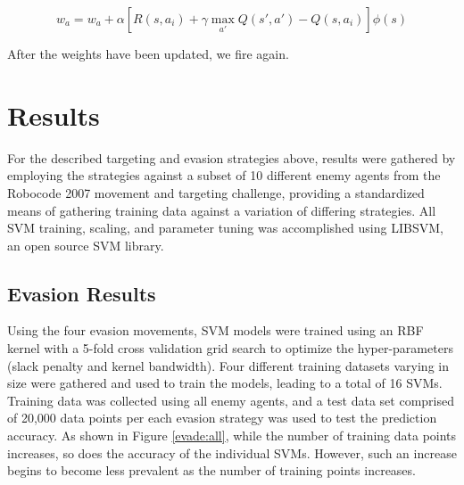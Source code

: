 \documentclass{article}
\theoremstyle{plain}
\theoremstyle{definition}
\theoremstyle{remark}
\begin{document}
$$w_a = w_a + \alpha\left[R(s, a_i) + \gamma\max_{a'}Q(s', a') - Q(s, a_i)\right]\phi(s)$$

After the weights have been updated, we fire again.

\section{Results}

For the described targeting and evasion strategies above, results were gathered by employing the strategies against a subset of 10 different enemy agents from the Robocode 2007 movement and targeting challenge, providing a standardized means of gathering training data against a variation of differing strategies. All SVM training, scaling, and parameter tuning was accomplished using LIBSVM, an open source SVM library\cite{libsvm}.

\subsection*{Evasion Results}
Using the four evasion movements, SVM models were trained using an RBF kernel with a 5-fold cross validation grid search to optimize the hyper-parameters (slack penalty and kernel bandwidth). Four different training datasets varying in size were gathered and used to train the models, leading to a total of 16 SVMs. Training data was collected using all enemy agents, and a test data set comprised of 20,000 data points per each evasion strategy was used to test the prediction accuracy. As shown in Figure \ref{evade:all}, while the number of training data points increases, so does the accuracy of the individual SVMs. However, such an increase begins to become less prevalent as the number of training points increases.
\end{document}

